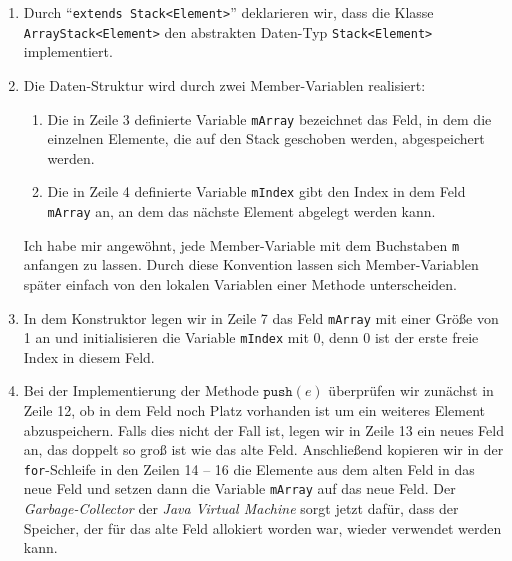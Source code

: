 \begin{enumerate}
\item Durch ``\texttt{extends Stack<Element>}'' deklarieren wir, dass die Klasse
      \texttt{ArrayStack<Element>} den abstrakten Daten-Typ \texttt{Stack<Element>}
      implementiert.
\item Die Daten-Struktur wird durch zwei Member-Variablen realisiert:
      \begin{enumerate}
      \item Die in Zeile 3 definierte Variable \texttt{mArray} bezeichnet das Feld,
            in dem die einzelnen Elemente, die auf den Stack geschoben werden,
            abgespeichert werden.
      \item Die in Zeile 4 definierte Variable \texttt{mIndex} gibt den Index in dem Feld
            \texttt{mArray} an, an dem das n\"achste Element abgelegt werden kann.
      \end{enumerate}
      Ich habe mir angew\"ohnt, jede Member-Variable mit dem Buchstaben \texttt{m}
      anfangen zu lassen.  Durch diese Konvention lassen sich Member-Variablen sp\"ater einfach von
      den lokalen Variablen einer Methode unterscheiden.
\item In dem Konstruktor legen wir in Zeile 7 das Feld \texttt{mArray} mit einer
      Gr\"o{\ss}e von 1 an und initialisieren die Variable \texttt{mIndex} mit 0, denn 
      0 ist der erste freie Index in diesem Feld.
\item Bei der Implementierung der Methode $\texttt{push}(e)$ \"uberpr\"ufen wir zun\"achst
      in Zeile 12, ob in dem Feld noch Platz vorhanden ist um
      ein weiteres Element abzuspeichern.  Falls dies nicht der Fall ist, 
      legen wir in Zeile 13  ein neues Feld an, das doppelt so gro{\ss} ist wie das alte Feld.
      Anschlie{\ss}end kopieren wir in der \texttt{for}-Schleife in den Zeilen 14 -- 16
      die Elemente aus dem alten Feld in das neue Feld und setzen dann die 
      Variable \texttt{mArray} auf das neue Feld.  Der \emph{Garbage-Collector} der 
      \textsl{Java Virtual Machine}  sorgt jetzt daf\"ur,
      dass der Speicher, der f\"ur das alte Feld allokiert worden war, 
      wieder verwendet werden kann.
      

\end{enumerate}
